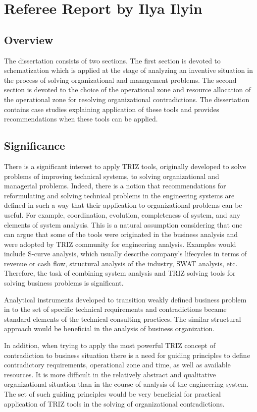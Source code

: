 \section{Referee Report by Ilya Ilyin}

\subsection*{Overview}
The dissertation consists of two sections. The first section is devoted to
schematization which is applied at the stage of analyzing an inventive
situation in the process of solving organizational and management problems.
The second section is devoted to the choice of the operational zone and
resource allocation of the operational zone for resolving organizational
contradictions. The dissertation contains case studies explaining application
of these tools and provides recommendations when these tools can be applied.

\subsection*{Significance}
There is a significant interest to apply TRIZ tools, originally developed to
solve problems of improving technical systems, to solving organizational and
managerial problems.  Indeed, there is a notion that recommendations for
reformulating and solving technical problems in the engineering systems are
defined in such a way that their application to organizational problems can be
useful. For example, coordination, evolution, completeness of system, and any
elements of system analysis. This is a natural assumption considering that one
can argue that some of the tools were originated in the business analysis and
were adopted by TRIZ community for engineering analysis.  Examples would
include S-curve analysis, which usually describe company’s lifecycles in terms
of revenue or cash flow, structural analysis of the industry, SWAT analysis,
etc.  Therefore, the task of combining system analysis and TRIZ solving tools
for solving business problems is significant.

Analytical instruments developed to transition weakly defined business problem
in to the set of specific technical requirements and contradictions became
standard elements of the technical consulting practices. The similar
structural approach would be beneficial in the analysis of business
organization.

In addition, when trying to apply the most powerful TRIZ concept of
contradiction to business situation there is a need for guiding principles to
define contradictory requirements, operational zone and time, as well as
available resources. It is more difficult in the relatively abstract and
qualitative organizational situation than in the course of analysis of the
engineering system. The set of such guiding principles would be very
beneficial for practical application of TRIZ tools in the solving of
organizational contradictions.

